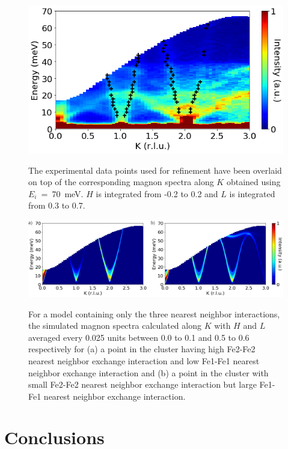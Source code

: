 \documentclass[10pt,doublespacing,edeposit]{uiucthesis2020}
\begin{document}
\begin{mainmatter}
\begin{figure}[h]
\centering\includegraphics[width=0.6\columnwidth]{figures/ch8/exp_data_points_0K0dot5.png} \\
\caption{\label{fig:exp_data_points_01L}
The experimental data points used for refinement have been overlaid on top of the corresponding magnon spectra along $K$ obtained using $E_i$~=~70~meV. $H$ is integrated from -0.2 to 0.2 and $L$ is integrated from 0.3 to 0.7.
} 
\end{figure}


\begin{figure}[h]
\centering\includegraphics[width=\columnwidth]{figures/ch8/suppl_simulated_magnon_spectra_3J.png} \\
\caption{\label{fig:3J_spinw_refinement}
For a model containing only the three nearest neighbor interactions, the simulated magnon spectra calculated along $K$ with $H$ and $L$ averaged every 0.025 units between 0.0 to 0.1 and 0.5 to 0.6 respectively for (a) a point in the cluster having high Fe2-Fe2 nearest neighbor exchange interaction and low Fe1-Fe1 nearest neighbor exchange interaction and (b) a point in the cluster with small Fe2-Fe2 nearest neighbor exchange interaction but large Fe1-Fe1 nearest neighbor exchange interaction.
}
\end{figure}


\chapter{Conclusions}

\Blindtext[6]

\end{mainmatter}



\begin{backmatter}




\end{backmatter}



\end{document}
